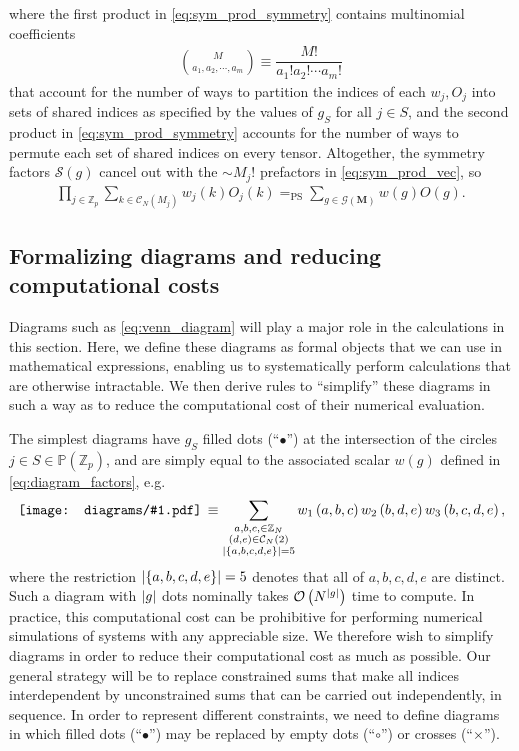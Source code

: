 \documentclass[nofootinbib,notitlepage,11pt]{revtex4-2}
\newcommand{\f}[2]{\dfrac{#1}{#2}} %
\newcommand{\p}[1]{\left(#1\right)} %
\renewcommand{\set}[1]{\left\{#1\right\}} %
\newcommand{\m}{\bm} %
\newcommand{\1}{\mathds{1}}
\newcommand{\C}{\mathcal{C}}
\newcommand{\G}{\mathcal{G}}
\renewcommand{\O}{\mathcal{O}}
\renewcommand{\S}{\mathcal{S}}
\newcommand{\PP}{\mathbb{P}}
\newcommand{\ZZ}{\mathbb{Z}}
\newcommand{\EQPS}{=_{\text{PS}}}
\newcommand{\diagram}[1]
{\,\texttt{[image: diagrams/\#1.pdf]}\,}
\begin{document}
where the first product in \eqref{eq:sym_prod_symmetry} contains
multinomial coefficients
\begin{align}
  { M \choose a_1, a_2, \cdots, a_m }
  \equiv \f{M!}{a_1!a_2!\cdots a_m!}
\end{align}
that account for the number of ways to partition the indices of each
$w_j,O_j$ into sets of shared indices as specified by the values of
$g_S$ for all $j\in S$, and the second product in
\eqref{eq:sym_prod_symmetry} accounts for the number of ways to
permute each set of shared indices on every tensor.  Altogether, the
symmetry factors $\S\p{g}$ cancel out with the $\sim M_j!$ prefactors
in \eqref{eq:sym_prod_vec}, so
\begin{align}
  \prod_{j\in\ZZ_p} \sum_{k\in\C_N\p{M_j}} w_j\p{k} O_j\p{k}
  \EQPS \sum_{g\in\G\p{\m M}} w\p{g} O\p{g}.
  \label{eq:sym_prod_group}
\end{align}

\subsection{Formalizing diagrams and reducing computational costs}
\label{sec:diagrams}

Diagrams such as \eqref{eq:venn_diagram} will play a major role in the
calculations in this section.  Here, we define these diagrams as
formal objects that we can use in mathematical expressions, enabling
us to systematically perform calculations that are otherwise
intractable.  We then derive rules to ``simplify'' these diagrams in
such a way as to reduce the computational cost of their numerical
evaluation.

The simplest diagrams have $g_S$ filled dots (``$\bullet$'') at the
intersection of the circles $j\in S\in\PP\p{\ZZ_p}$, and are simply
equal to the associated scalar $w\p{g}$ defined in
\eqref{eq:diagram_factors}, e.g.
\begin{align}
  \diagram{example_123}
  \equiv \sum_{\substack{a,b,c,\in\ZZ_N\\\p{d,e}\in\C_N\p{2}\\
      \abs{\set{a,b,c,d,e}}=5}}
  w_1\p{a,b,c} w_2\p{b,d,e} w_3\p{b,c,d,e},
\end{align}
where the restriction $\abs{\set{a,b,c,d,e}}=5$ denotes that all of
$a,b,c,d,e$ are distinct.  Such a diagram with $\abs{g}$ dots
nominally takes $\O\p{N^{\abs{g}}}$ time to compute.  In practice,
this computational cost can be prohibitive for performing numerical
simulations of systems with any appreciable size.  We therefore wish
to simplify diagrams in order to reduce their computational cost as
much as possible.  Our general strategy will be to replace constrained
sums that make all indices interdependent by unconstrained sums that
can be carried out independently, in sequence.  In order to represent
different constraints, we need to define diagrams in which filled dots
(``$\bullet$'') may be replaced by empty dots (``$\circ$'') or crosses
(``$\bm\times$'').
\end{document}
